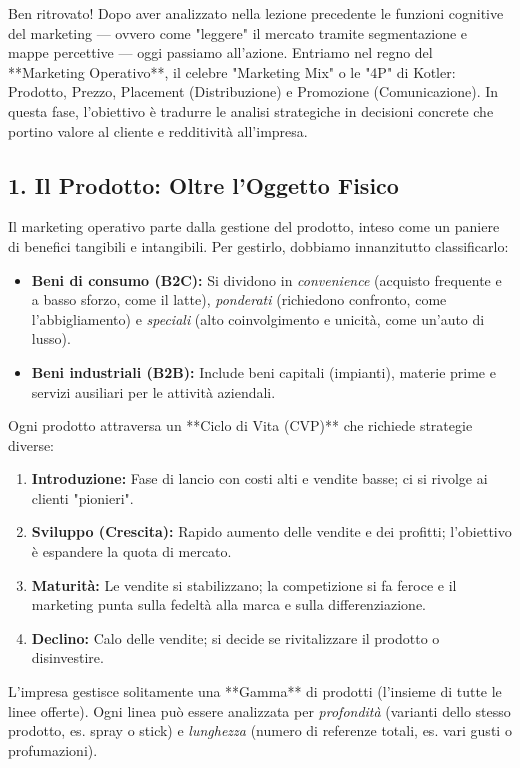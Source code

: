 \documentclass[a4paper,10pt]{article}
\begin{document}
Ben ritrovato! Dopo aver analizzato nella lezione precedente le funzioni cognitive del marketing — ovvero come "leggere" il mercato tramite segmentazione e mappe percettive — oggi passiamo all'azione. Entriamo nel regno del **Marketing Operativo**, il celebre "Marketing Mix" o le "4P" di Kotler: Prodotto, Prezzo, Placement (Distribuzione) e Promozione (Comunicazione). In questa fase, l'obiettivo è tradurre le analisi strategiche in decisioni concrete che portino valore al cliente e redditività all'impresa.

\subsection*{1. Il Prodotto: Oltre l'Oggetto Fisico}

Il marketing operativo parte dalla gestione del prodotto, inteso come un paniere di benefici tangibili e intangibili. Per gestirlo, dobbiamo innanzitutto classificarlo:
\begin{itemize}
    \item \textbf{Beni di consumo (B2C):} Si dividono in \textit{convenience} (acquisto frequente e a basso sforzo, come il latte), \textit{ponderati} (richiedono confronto, come l'abbigliamento) e \textit{speciali} (alto coinvolgimento e unicità, come un'auto di lusso).
    \item \textbf{Beni industriali (B2B):} Include beni capitali (impianti), materie prime e servizi ausiliari per le attività aziendali.
\end{itemize}

Ogni prodotto attraversa un **Ciclo di Vita (CVP)** che richiede strategie diverse:
\begin{enumerate}
    \item \textbf{Introduzione:} Fase di lancio con costi alti e vendite basse; ci si rivolge ai clienti "pionieri".
    \item \textbf{Sviluppo (Crescita):} Rapido aumento delle vendite e dei profitti; l'obiettivo è espandere la quota di mercato.
    \item \textbf{Maturità:} Le vendite si stabilizzano; la competizione si fa feroce e il marketing punta sulla fedeltà alla marca e sulla differenziazione.
    \item \textbf{Declino:} Calo delle vendite; si decide se rivitalizzare il prodotto o disinvestire.
\end{enumerate}

L'impresa gestisce solitamente una **Gamma** di prodotti (l'insieme di tutte le linee offerte). Ogni linea può essere analizzata per \textit{profondità} (varianti dello stesso prodotto, es. spray o stick) e \textit{lunghezza} (numero di referenze totali, es. vari gusti o profumazioni).
\end{document}
